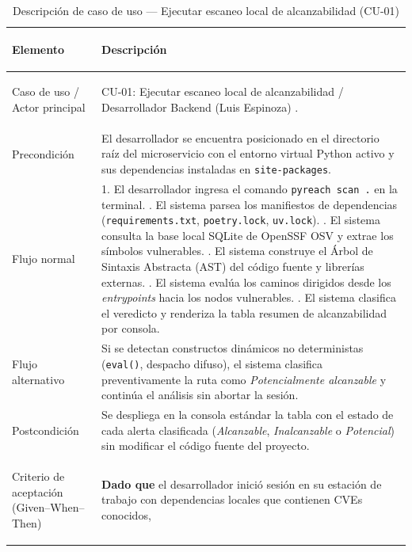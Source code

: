 \begin{table}[H]
\centering
\caption{Descripción de caso de uso — Ejecutar escaneo local de alcanzabilidad (CU-01)}
\label{tab:cu01_desarrollo}
\small
{}
\begin{tabularx}{\textwidth}{>{\bfseries\raggedright\arraybackslash}p{4.2cm} X}
\toprule
\textbf{Elemento} & \textbf{Descripción} \\
\midrule
Caso de uso / Actor principal & CU-01: Ejecutar escaneo local de alcanzabilidad / Desarrollador Backend (Luis Espinoza) \parencite{kendall2019systems}. \\ %
\addlinespace
Precondición & El desarrollador se encuentra posicionado en el directorio raíz del microservicio con el entorno virtual Python activo y sus dependencias instaladas en \texttt{site-packages}. \\ %
\addlinespace
Flujo normal & 
1. El desarrollador ingresa el comando \texttt{pyreach scan .} en la terminal. \newline
2. El sistema parsea los manifiestos de dependencias (\texttt{requirements.txt}, \texttt{poetry.lock}, \texttt{uv.lock}). \newline
3. El sistema consulta la base local SQLite de OpenSSF OSV y extrae los símbolos vulnerables. \newline
4. El sistema construye el Árbol de Sintaxis Abstracta (AST) del código fuente y librerías externas. \newline
5. El sistema evalúa los caminos dirigidos desde los \textit{entrypoints} hacia los nodos vulnerables. \newline
6. El sistema clasifica el veredicto y renderiza la tabla resumen de alcanzabilidad por consola. \\ %
\addlinespace
Flujo alternativo & Si se detectan constructos dinámicos no deterministas (\texttt{eval()}, despacho difuso), el sistema clasifica preventivamente la ruta como \textit{Potencialmente alcanzable} y continúa el análisis sin abortar la sesión. \\ %
\addlinespace
Postcondición & Se despliega en la consola estándar la tabla con el estado de cada alerta clasificada (\textit{Alcanzable}, \textit{Inalcanzable} o \textit{Potencial}) sin modificar el código fuente del proyecto. \\ %
\addlinespace
Criterio de aceptación (Given--When--Then) & 
\textbf{Dado que} el desarrollador inició sesión en su estación de trabajo con dependencias locales que contienen CVEs conocidos, \newline

\end{tabularx}
\end{table}

